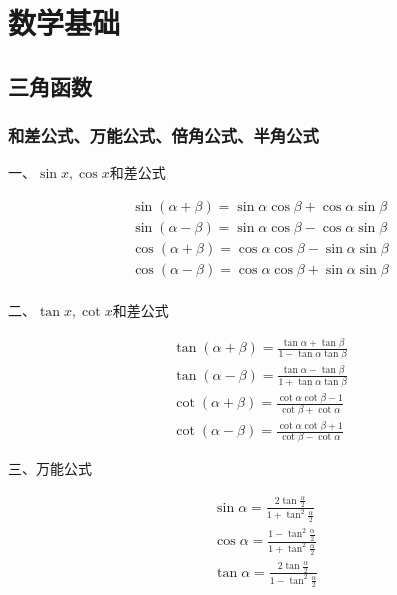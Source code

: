 


\chapter{数学基础}


\section{三角函数}

\subsection{和差公式、万能公式、倍角公式、半角公式}

\noindent 一、$\sin x, \cos x$和差公式

\begin{gather*}
  \sin (\alpha+\beta)=\sin \alpha \cos \beta+\cos \alpha \sin \beta \\
  \sin (\alpha-\beta)=\sin \alpha \cos \beta-\cos \alpha \sin \beta \\
  \cos (\alpha+\beta)=\cos \alpha \cos \beta-\sin \alpha \sin \beta \\
  \cos (\alpha-\beta)=\cos \alpha \cos \beta+\sin \alpha \sin \beta \\
\end{gather*}

\noindent 二、$\tan x, \cot x$和差公式

\begin{gather*}
  \tan (\alpha+\beta)=\frac{\tan \alpha+\tan \beta}{1-\tan \alpha \tan \beta} \\
  \tan (\alpha-\beta)=\frac{\tan \alpha-\tan \beta}{1+\tan \alpha \tan \beta} \\
  \cot (\alpha+\beta)=\frac{\cot \alpha \cot \beta-1}{\cot \beta+\cot \alpha} \\
  \cot (\alpha-\beta)=\frac{\cot \alpha \cot \beta+1}{\cot \beta-\cot \alpha}
\end{gather*}

\noindent 三、万能公式

\begin{align*}
  &\sin \alpha=\frac{2 \tan \frac{\alpha}{2}}{1+\tan ^{2} \frac{\alpha}{2}} \\
  &\cos \alpha=\frac{1-\tan ^{2} \frac{\alpha}{2}}{1+\tan ^{2} \frac{\alpha}{2}} \\
  &\tan \alpha=\frac{2 \tan \frac{\alpha}{2}}{1-\tan ^{2} \frac{\alpha}{2}}
\end{align*}

